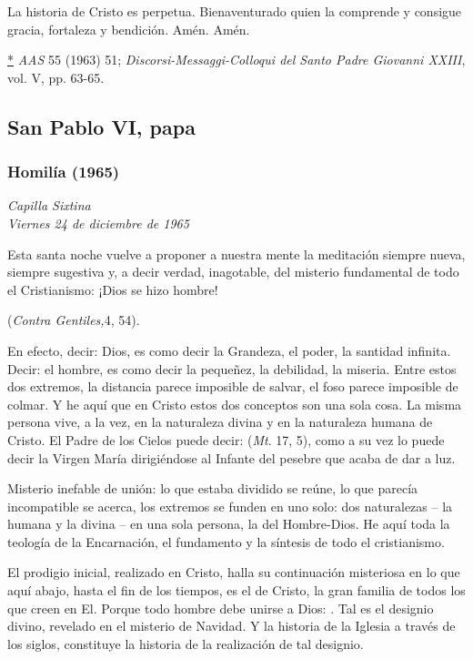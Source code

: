\begin{body}
\begin{body}
La historia de Cristo es perpetua. Bienaventurado quien la comprende y consigue gracia, fortaleza y bendición. Amén. Amén.


\protect\hyperlink{_ednrefux2a}{*}\emph{ AAS} 55 (1963) 51; \emph{Discorsi-Messaggi-Colloqui del Santo Padre Giovanni XXIII}, vol. V, pp. 63-65.


\subsection{San Pablo VI, papa}

\subsubsection{Homilía (1965)} \emph{Capilla Sixtina\\ Viernes 24 de diciembre de 1965}


Esta santa noche vuelve a proponer a nuestra mente la meditación siempre nueva, siempre sugestiva y, a decir verdad, inagotable, del misterio fundamental de todo el Cristianismo: ¡Dios se hizo hombre!

 (\emph{Contra Gentiles,}4, 54).

En efecto, decir: Dios, es como decir la Grandeza, el poder, la santidad infinita. Decir: el hombre, es como decir la pequeñez, la debilidad, la miseria. Entre estos dos extremos, la distancia parece imposible de salvar, el foso parece imposible de colmar. Y he aquí que en Cristo estos dos conceptos son una sola cosa. La misma persona vive, a la vez, en la naturaleza divina y en la naturaleza humana de Cristo. El Padre de los Cielos puede decir:  (\emph{Mt}. 17, 5), como a su vez lo puede decir la Virgen María dirigiéndose al Infante del pesebre que acaba de dar a luz.

Misterio inefable de unión: lo que estaba dividido se reúne, lo que parecía incompatible se acerca, los extremos se funden en uno solo: dos naturalezas -- la humana y la divina -- en una sola persona, la del Hombre-Dios. He aquí toda la teología de la Encarnación, el fundamento y la síntesis de todo el cristianismo.

El prodigio inicial, realizado en Cristo, halla su continuación misteriosa en lo que aquí abajo, hasta el fin de los tiempos, es el  de Cristo, la gran familia de todos los que creen en El. Porque todo hombre debe unirse a Dios: . Tal es el designio divino, revelado en el misterio de Navidad. Y la historia de la Iglesia a través de los siglos, constituye la historia de la realización de tal designio.


\end{body}
\end{body}
